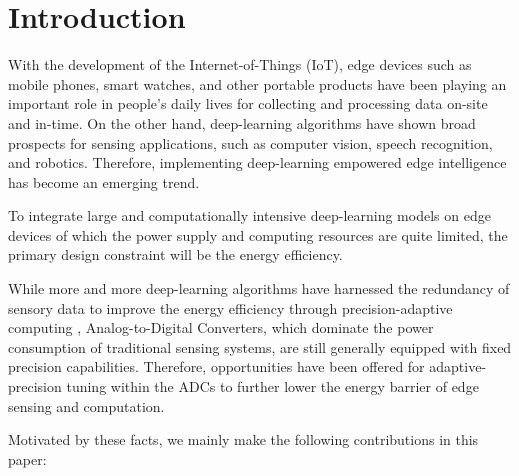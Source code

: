 \section{Introduction}

With the development of the Internet-of-Things (IoT), edge devices such as mobile phones, smart watches, and other portable products have been playing an important role in people’s daily lives 
for collecting and processing data on-site and in-time. On the other hand, deep-learning algorithms have shown broad prospects for sensing applications, such as computer vision, speech recognition, 
and robotics. Therefore, implementing deep-learning empowered edge intelligence has become an emerging trend.

To integrate large and computationally intensive deep-learning models on edge devices of which the power supply and computing resources are quite limited, the primary design constraint will be the energy efficiency.

While more and more deep-learning algorithms have harnessed the redundancy of sensory data to improve the energy efficiency through precision-adaptive computing \cite{leibe_xnor-net_2016}\cite{li_ternary_2016}\cite{park_energy-efficient_2018}, 
Analog-to-Digital Converters, which dominate the power consumption of 
traditional sensing systems, are still generally equipped with fixed precision capabilities. Therefore, opportunities have been offered for adaptive-precision tuning within the ADCs to further lower the energy barrier of edge sensing and computation. 


Motivated by these facts, we mainly make the following contributions in this paper:

